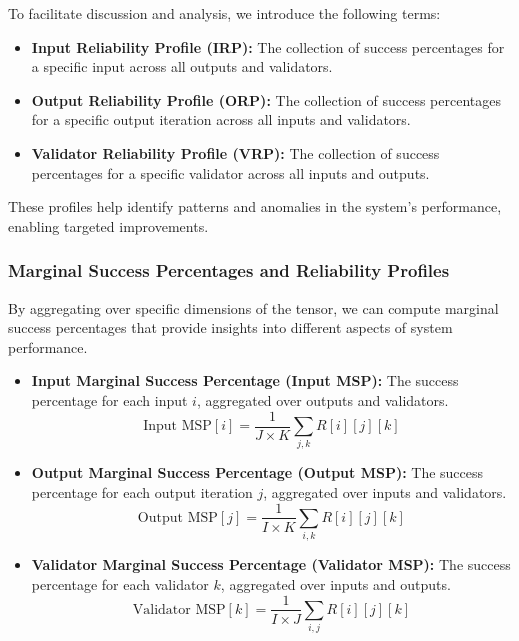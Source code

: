 \documentclass{article}
\begin{document}
To facilitate discussion and analysis, we introduce the following terms:

\begin{itemize}
    \item \textbf{Input Reliability Profile (IRP):} The collection of success percentages for a specific input across all outputs and validators.
    \item \textbf{Output Reliability Profile (ORP):} The collection of success percentages for a specific output iteration across all inputs and validators.
    \item \textbf{Validator Reliability Profile (VRP):} The collection of success percentages for a specific validator across all inputs and outputs.
\end{itemize}

These profiles help identify patterns and anomalies in the system's performance, enabling targeted improvements.

\subsubsection{Marginal Success Percentages and Reliability Profiles}

By aggregating over specific dimensions of the tensor, we can compute marginal success percentages that provide insights into different aspects of system performance.

\begin{itemize}
    \item \textbf{Input Marginal Success Percentage (Input MSP):} The success percentage for each input \( i \), aggregated over outputs and validators.
    \begin{equation*}
    \text{Input MSP}[i] = \frac{1}{J \times K} \sum_{j,k} R[i][j][k]
    \end{equation*}
    \item \textbf{Output Marginal Success Percentage (Output MSP):} The success percentage for each output iteration \( j \), aggregated over inputs and validators.
    \begin{equation*}
    \text{Output MSP}[j] = \frac{1}{I \times K} \sum_{i,k} R[i][j][k]
    \end{equation*}
    \item \textbf{Validator Marginal Success Percentage (Validator MSP):} The success percentage for each validator \( k \), aggregated over inputs and outputs.
    \begin{equation*}
    \text{Validator MSP}[k] = \frac{1}{I \times J} \sum_{i,j} R[i][j][k]
    \end{equation*}
\end{itemize}
\end{document}
